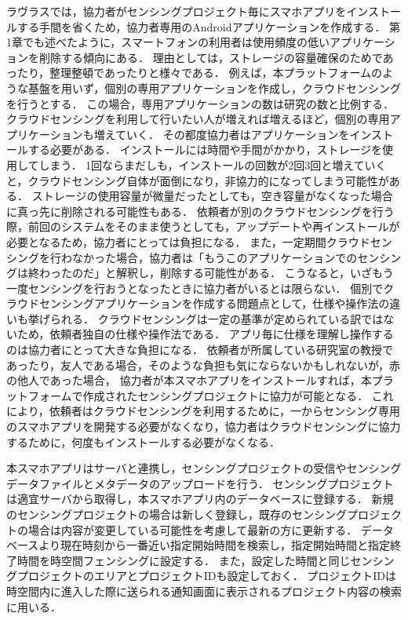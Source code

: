 ラヴラスでは，協力者がセンシングプロジェクト毎にスマホアプリをインストールする手間を省くため，協力者専用のAndroidアプリケーションを作成する．
第1章でも述べたように，スマートフォンの利用者は使用頻度の低いアプリケーションを削除する傾向にある．
理由としては，ストレージの容量確保のためであったり，整理整頓であったりと様々である．
例えば，本プラットフォームのような基盤を用いず，個別の専用アプリケーションを作成し，クラウドセンシングを行うとする．
この場合，専用アプリケーションの数は研究の数と比例する．
クラウドセンシングを利用して行いたい人が増えれば増えるほど，個別の専用アプリケーションも増えていく．
その都度協力者はアプリケーションをインストールする必要がある．
インストールには時間や手間がかかり，ストレージを使用してしまう．
1回ならまだしも，インストールの回数が2回3回と増えていくと，クラウドセンシング自体が面倒になり，非協力的になってしまう可能性がある．
ストレージの使用容量が微量だったとしても，空き容量がなくなった場合に真っ先に削除される可能性もある．
依頼者が別のクラウドセンシングを行う際，前回のシステムをそのまま使うとしても，アップデートや再インストールが必要となるため，協力者にとっては負担になる．
また，一定期間クラウドセンシングを行わなかった場合，協力者は「もうこのアプリケーションでのセンシングは終わったのだ」と解釈し，削除する可能性がある．
こうなると，いざもう一度センシングを行おうとなったときに協力者がいるとは限らない．
個別でクラウドセンシングアプリケーションを作成する問題点として，仕様や操作法の違いも挙げられる．
クラウドセンシングは一定の基準が定められている訳ではないため，依頼者独自の仕様や操作法である．
アプリ毎に仕様を理解し操作するのは協力者にとって大きな負担になる．
依頼者が所属している研究室の教授であったり，友人である場合，そのような負担も気にならないかもしれないが，赤の他人であった場合，
協力者が本スマホアプリをインストールすれば，本プラットフォームで作成されたセンシングプロジェクトに協力が可能となる．
これにより，依頼者はクラウドセンシングを利用するために，一からセンシング専用のスマホアプリを開発する必要がなくなり，協力者はクラウドセンシングに協力するために，何度もインストールする必要がなくなる．

本スマホアプリはサーバと連携し，センシングプロジェクトの受信やセンシングデータファイルとメタデータのアップロードを行う．
センシングプロジェクトは適宜サーバから取得し，本スマホアプリ内のデータベースに登録する．
新規のセンシングプロジェクトの場合は新しく登録し，既存のセンシングプロジェクトの場合は内容が変更している可能性を考慮して最新の方に更新する．
データベースより現在時刻から一番近い指定開始時間を検索し，指定開始時間と指定終了時間を時空間フェンシングに設定する．
また，設定した時間と同じセンシングプロジェクトのエリアとプロジェクトIDも設定しておく．
プロジェクトIDは時空間内に進入した際に送られる通知画面に表示されるプロジェクト内容の検索に用いる．

